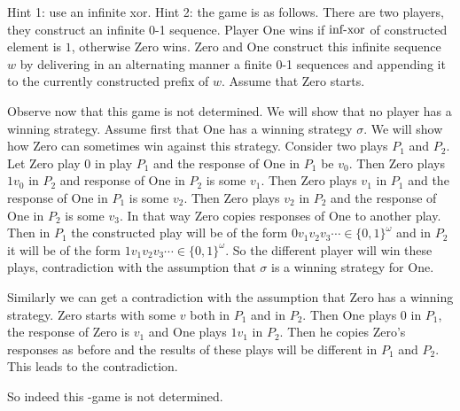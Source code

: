 {
Hint 1: use an infinite xor.
Hint 2: the game is as follows. There are two players, they construct an infinite 0-1 sequence.
Player One wins if $\textup{inf-xor}$ of constructed element is $1$, otherwise Zero wins.
Zero and One construct this infinite sequence $w$ by delivering in an alternating manner a finite 0-1 sequences
and appending it to the currently constructed prefix of $w$.
Assume that Zero starts.

Observe now that this game is not determined. We will show that no player has a winning strategy.
Assume first that One has a winning strategy $\sigma$. We will show how Zero can sometimes win against this
strategy. Consider two plays $P_1$ and $P_2$.
Let Zero play $0$ in play $P_1$ and the response of One in $P_1$ be $v_0$.
Then Zero plays $1 v_0$ in $P_2$ and response of One in $P_2$ is some $v_1$.
Then Zero plays $v_1$ in $P_1$ and the response of One in $P_1$ is some $v_2$.
Then Zero plays $v_2$ in $P_2$ and the response of One in $P_2$ is some $v_3$.
In that way Zero copies responses of One to another play. Then in $P_1$ the constructed play
will be of the form $0 v_1 v_2 v_3 \cdots \in \{0, 1\}^\omega$ and in $P_2$ it will be of the
form $1 v_1 v_2 v_3 \cdots \in \{0, 1\}^\omega$. So the different player will win these plays, contradiction
with the assumption that $\sigma$ is a winning strategy for One.

Similarly we can get a contradiction with the assumption that Zero has a winning strategy.
Zero starts with some $v$ both in $P_1$ and in $P_2$. Then One plays $0$ in $P_1$, the response of Zero is $v_1$
and One plays $1 v_1$ in $P_2$. Then he copies Zero's responses as before and the results of these plays will be different
in $P_1$ and $P_2$. This leads to the contradiction.

So indeed this \xor-game is not determined.
}



